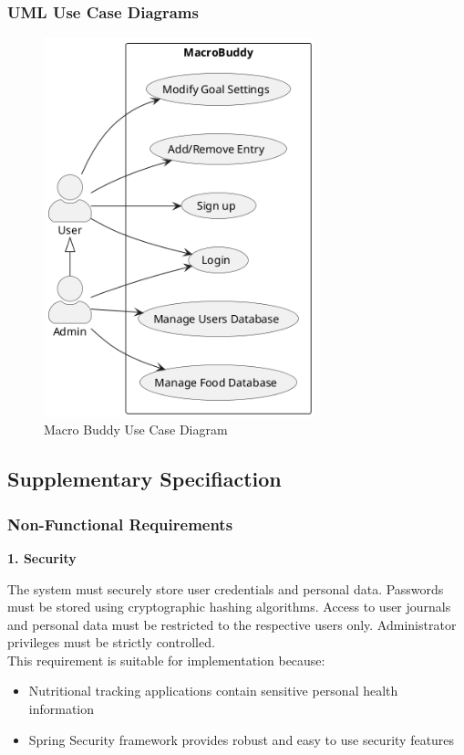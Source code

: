 \documentclass[a4paper,10pt]{article}
\begin{document}
        \subsubsection{UML Use Case Diagrams}
        \begin{figure}[h]
        \centering
        \includegraphics[width=0.7\textwidth]{uml.png}
        \caption{Macro Buddy Use Case Diagram}
        \end{figure}

    \newpage
    \subsection{Supplementary Specifiaction}

        \subsubsection{Non-Functional Requirements}
        \textbf{1. Security}

        The system must securely store user credentials and personal data. Passwords must be stored using cryptographic hashing algorithms. Access to user journals and personal data must be restricted to the respective users only. Administrator privileges must be strictly controlled. \\

        This requirement is suitable for implementation because:
        \begin{itemize}
            \item Nutritional tracking applications contain sensitive personal health information
            \item Spring Security framework provides robust and easy to use security features
        \end{itemize}
\end{document}
